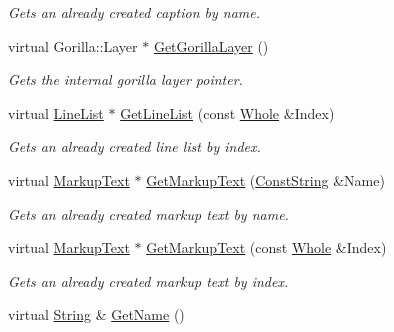 \begin{DoxyCompactItemize}
\begin{DoxyCompactList}\small\item\em Gets an already created caption by name. \item\end{DoxyCompactList}\item 
\hypertarget{classphys_1_1UI_1_1Layer_a6528081453b4f2be4d7a4ad8878edbf0}{
virtual Gorilla::Layer $\ast$ \hyperlink{classphys_1_1UI_1_1Layer_a6528081453b4f2be4d7a4ad8878edbf0}{GetGorillaLayer} ()}
\label{classphys_1_1UI_1_1Layer_a6528081453b4f2be4d7a4ad8878edbf0}

\begin{DoxyCompactList}\small\item\em Gets the internal gorilla layer pointer. \item\end{DoxyCompactList}\item 
virtual \hyperlink{classphys_1_1UI_1_1LineList}{LineList} $\ast$ \hyperlink{classphys_1_1UI_1_1Layer_aa0ec04b512d7c2ad2808a2dc0e435905}{GetLineList} (const \hyperlink{namespacephys_a460f6bc24c8dd347b05e0366ae34f34a}{Whole} \&Index)
\begin{DoxyCompactList}\small\item\em Gets an already created line list by index. \item\end{DoxyCompactList}\item 
virtual \hyperlink{classphys_1_1UI_1_1MarkupText}{MarkupText} $\ast$ \hyperlink{classphys_1_1UI_1_1Layer_aed2d7a1ad478f3d92005aeec4a777473}{GetMarkupText} (\hyperlink{namespacephys_a5ce5049f8b4bf88d6413c47b504ebb31}{ConstString} \&Name)
\begin{DoxyCompactList}\small\item\em Gets an already created markup text by name. \item\end{DoxyCompactList}\item 
virtual \hyperlink{classphys_1_1UI_1_1MarkupText}{MarkupText} $\ast$ \hyperlink{classphys_1_1UI_1_1Layer_ae69320aefcfbc6f7f8c7364a04b2ae59}{GetMarkupText} (const \hyperlink{namespacephys_a460f6bc24c8dd347b05e0366ae34f34a}{Whole} \&Index)
\begin{DoxyCompactList}\small\item\em Gets an already created markup text by index. \item\end{DoxyCompactList}\item 
virtual \hyperlink{namespacephys_aa03900411993de7fbfec4789bc1d392e}{String} \& \hyperlink{classphys_1_1UI_1_1Layer_a362edb47fdc9aa595dcaffc1ed617ae4}{GetName} ()

\end{DoxyCompactItemize}
